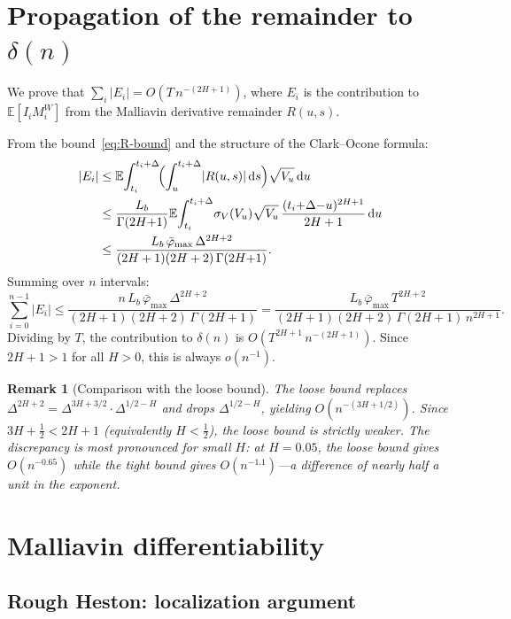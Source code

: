 \documentclass[12pt]{article}
\newtheorem{remark}{Remark}
\theoremstyle{definition}
\newcommand{\E}{\mathbb{E}}
\newcommand{\dd}{\mathrm{d}}
\begin{document}
\section{Propagation of the remainder to $\delta(n)$}
\label{app:remainder-prop}

We prove that $\sum_i |E_i| = O(T\,n^{-(2H+1)})$, where
$E_i$ is the contribution to $\E[I_i M_i^W]$ from the Malliavin
derivative remainder $R(u,s)$.

From the bound~\eqref{eq:R-bound} and the structure of the
Clark--Ocone formula:
\begin{align*}
  |E_i|
  &\le \E\!\int_{t_i}^{t_i+\Delta}\!
  \Bigl(\int_u^{t_i+\Delta}\! |R(u,s)|\,\dd s\Bigr)
  \sqrt{V_u}\,\dd u \\
  &\le \frac{L_b}{\Gamma(2H{+}1)}
  \E\!\int_{t_i}^{t_i+\Delta}\!
  \sigma_V(V_u)\sqrt{V_u}\,
  \frac{(t_i{+}\Delta{-}u)^{2H+1}}{2H+1}\,\dd u \\
  &\le \frac{L_b\,\bar\varphi_{\max}\,\Delta^{2H+2}}
  {(2H+1)(2H+2)\,\Gamma(2H{+}1)}.
\end{align*}
Summing over $n$ intervals:
\[
  \sum_{i=0}^{n-1} |E_i|
  \le \frac{n\,L_b\,\bar\varphi_{\max}\,\Delta^{2H+2}}
  {(2H+1)(2H+2)\,\Gamma(2H{+}1)}
  = \frac{L_b\,\bar\varphi_{\max}\,T^{2H+2}}
  {(2H+1)(2H+2)\,\Gamma(2H{+}1)\,n^{2H+1}}.
\]
Dividing by $T$, the contribution to $\delta(n)$ is
$O(T^{2H+1}\,n^{-(2H+1)})$.
Since $2H + 1 > 1$ for all $H > 0$, this is always $o(n^{-1})$.

\begin{remark}[Comparison with the loose bound]
The loose bound replaces
$\Delta^{2H+2} = \Delta^{3H+3/2}\cdot\Delta^{1/2-H}$
and drops $\Delta^{1/2-H}$, yielding $O(n^{-(3H+1/2)})$.
Since $3H + \tfrac12 < 2H + 1$ (equivalently $H < \tfrac12$),
the loose bound is strictly weaker.
The discrepancy is most pronounced for small $H$: at $H = 0.05$,
the loose bound gives $O(n^{-0.65})$ while the tight bound gives
$O(n^{-1.1})$---a difference of nearly half a unit in the exponent.
\end{remark}

\section{Malliavin differentiability}\label{app:malliavin-diff}

\subsection{Rough Heston: localization argument}
\end{document}
